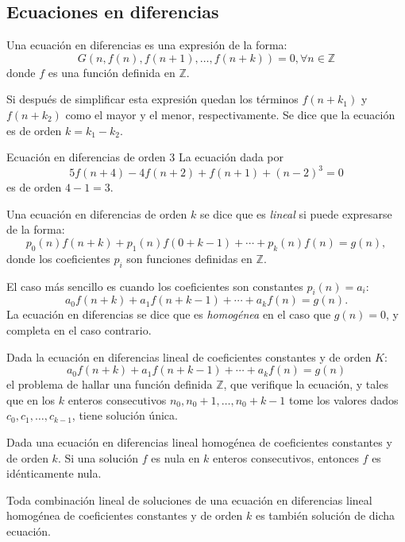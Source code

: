 \subsection{Ecuaciones en diferencias}
Una ecuación en diferencias es una expresión de la forma: \[ G\left(n,f(n),f(n+1),\ldots,f(n+k)\right)=0,\forall n\in\mathds{Z} \] donde $f$ es una función definida en $\mathds{Z}$.

Si después de simplificar esta expresión quedan los términos $f\left(n+k_{1}\right)$ y $f\left(n+k_{2}\right)$ como el mayor y el menor, respectivamente. Se dice que la ecuación es de orden $k=k_{1}-k_{2}$.
\begin{example}{Ecuación en diferencias de orden $3$}
	La ecuación dada por \[ 5f(n+4)-4f(n+2)+f(n+1)+(n-2)^{3}=0 \] es de orden $4-1=3$.
\end{example}
Una ecuación en diferencias de orden $k$ se dice que es \emph{lineal} si puede expresarse de la forma: \[ p_{0}(n)f(n+k)+p_{1}(n)f(0+k-1)+\cdots+p_{k}(n)f(n)=g(n), \] donde los coeficientes $p_{i}$ son funciones definidas en $\mathds{Z}$.

El caso más sencillo es cuando los coeficientes son constantes $p_{i}(n)=a_{i}$: \[ a_{0}f(n+k)+a_{1}f(n+k-1)+\cdots+a_{k}f(n)=g(n). \] La ecuación en diferencias se dice que es \emph{homogénea} en el caso que $g(n)=0$, y completa en el caso contrario.

\begin{theorem}{}
	Dada la ecuación en diferencias lineal de coeficientes constantes y de orden $ K $: \[ a_{0}f(n+k)+a_{1}f(n+k-1)+\cdots+a_{k}f(n)=g(n) \] el problema de hallar una función definida $\mathds{Z}$, que verifique la ecuación, y tales que en los $k$ enteros consecutivos $n_{0},n_{0}+1,\ldots,n_{0}+k-1$ tome los valores dados $c_{0},c_{1},\ldots,c_{k-1}$, tiene solución única.
\end{theorem}

\begin{theorem}{}
	Dada una ecuación en diferencias lineal homogénea de coeficientes constantes y de orden $k$. Si una solución $f$ es nula en $k$ enteros consecutivos, entonces $f$ es idénticamente nula.
\end{theorem}

\begin{theorem}{}
	Toda combinación lineal de soluciones de una ecuación en diferencias lineal homogénea de coeficientes constantes y de orden $k$ es también solución de dicha ecuación.
\end{theorem}

